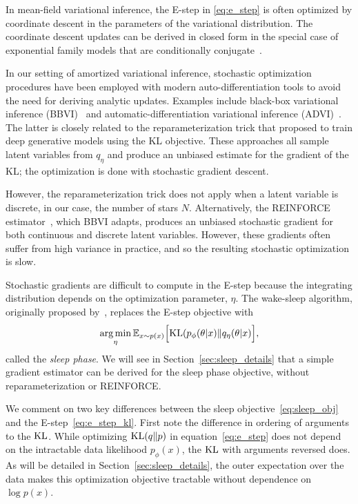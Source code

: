 In mean-field variational inference, the E-step in \eqref{eq:e_step} is often optimized by coordinate descent in the parameters of the variational distribution. 
The coordinate descent updates can be derived in closed form in the special case of exponential family models that are conditionally conjugate~\cite{Blei_2017_vi_review}. 

In our setting of amortized variational inference, stochastic 
optimization procedures have been employed with modern 
auto-differentiation tools to avoid the need for deriving 
analytic updates. Examples include black-box variational inference (BBVI)~\cite{ranganath2013black} 
and automatic-differentiation variational inference (ADVI)~\cite{kucukelbir2016automatic}. The latter 
is closely related to the reparameterization trick that \cite{kingma2013autoencoding, rezende2014stochastic} proposed to train deep generative models using the KL objective. 
These approaches all sample latent variables from $q_\eta$ and produce an unbiased estimate 
for the gradient of the KL; the optimization is done with stochastic gradient descent. 

However, the reparameterization trick does not apply when a latent variable is discrete, in our case, the number of stars $N$. Alternatively, the REINFORCE estimator~\cite{Williams1992reinforce}, which BBVI adapts, produces an unbiased stochastic gradient for both continuous and discrete latent variables. However, these gradients often suffer from high variance in practice, and so the resulting stochastic optimization is slow. 

Stochastic gradients are difficult to compute in the E-step because the integrating distribution depends on the optimization parameter, $\eta$. 
The wake-sleep algorithm, originally proposed by~\cite{Hinton1995wake_sleep}, replaces the 
E-step objective with 
\begin{align}
    \operatorname*{arg\,min}_{\eta} \mathbb{E}_{x \sim p(x)}\Big[\textrm{KL}(p_\phi(\theta | x) \| q_\eta(\theta | x)\Big]
    \label{eq:sleep_obj},
\end{align}
called the {\itshape sleep phase}. We will see in Section~\ref{sec:sleep_details} that a simple gradient estimator can be derived for the sleep phase objective, without 
reparameterization or REINFORCE. 

We comment on two key differences between the sleep objective~\eqref{eq:sleep_obj} and the E-step~\eqref{eq:e_step_kl}. First note the difference in ordering of arguments to the $\textrm{KL}$. 
While optimizing $\textrm{KL}(q\|p)$ in equation~\eqref{eq:e_step} does not depend on the intractable 
data likelihood $p_\phi(x)$, the $\textrm{KL}$ with arguments reversed does. 
As will be detailed in Section~\ref{sec:sleep_details}, the outer expectation over the data makes this optimization objective tractable without dependence on $\log p(x)$. 

